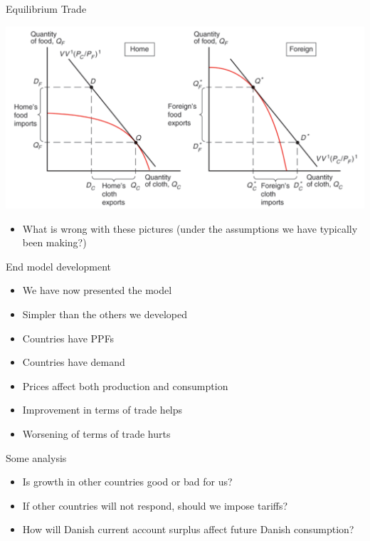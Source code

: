 \documentclass[ignorenonframetext,]{beamer}
\begin{document}
\begin{frame}{Equilibrium Trade}

    \includegraphics[scale=0.25]{trade_flows.png}
    \begin{itemize}
        \item What is wrong with these pictures (under the assumptions we have typically been making?)
    \end{itemize}

\end{frame}

\begin{frame}{End model development}

    \begin{itemize}
        \item We have now presented the model
        \item Simpler than the others we developed 
        \item Countries have PPFs
        \item Countries have demand
        \item Prices affect both production and consumption 
        \item Improvement in terms of trade helps
        \item Worsening of terms of trade hurts
    \end{itemize}

\end{frame}

\begin{frame}{Some analysis}

    \begin{itemize}
        \item Is growth in other countries good or bad for us?
        \item If other countries will not respond, should we impose tariffs?
        \item How will Danish current account surplus affect future Danish consumption? 
    \end{itemize}

\end{frame}
\end{document}
